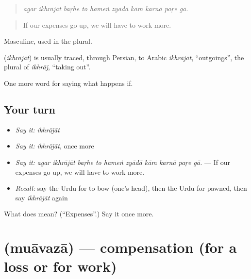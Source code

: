 \begin{quote}
         
\end{quote}

\begin{quote}
\emph{agar ikhrājāt baṛhe to hameṅ zyādā kām karnā paṛe gā.}
\end{quote}

\begin{quote}
If our expenses go up, we will have to work more.
\end{quote}

Masculine, used in the plural.

\begin{cousinweb}
\textbf{} (\emph{ikhrājāt}) is usually traced, through Persian, to Arabic \emph{ikhrājāt}, \textquotedblleft{}outgoings\textquotedblright{}, the plural of \emph{ikhrāj}, \textquotedblleft{}taking out\textquotedblright{}.
\end{cousinweb}

\begin{grammarlens}[title={What you've built}]
One more word for saying what happens if.
\end{grammarlens}

\subsection*{Your turn}
\begin{itemize}
\raggedright
  \item \emph{Say it:} \emph{ikhrājāt}
  \item \emph{Say it:} \emph{ikhrājāt}, once more
  \item \emph{Say it:} \emph{agar ikhrājāt baṛhe to hameṅ zyādā kām karnā paṛe gā.} — If our expenses go up, we will have to work more.
  \item \emph{Recall:} say the Urdu for to bow (one's head), then the Urdu for pawned, then say \emph{ikhrājāt} again
\end{itemize}

\begin{tcolorbox}[breakable,colback=teal!4,colframe=teal!35!black,title={Before you move on}]
What does  mean? (\textquotedblleft{}Expenses\textquotedblright{}.) Say it once more.
\end{tcolorbox}
\section[\texorpdfstring{\ur{معاوضہ} (muāvazā)}{معاوضہ (muāvazā)}]{ (muāvazā) — compensation (for a loss or for work)}

